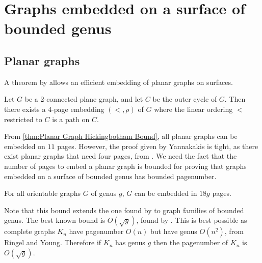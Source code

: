 
\section{Graphs embedded on a surface of bounded genus}\label{sec:pagenumber_bounded_genus}

\subsection{Planar graphs}\label{ssec:Planar_Graphs}
A theorem by \textcite{yannakakisEmbeddingPlanarGraphs1989} allows an efficient embedding of planar graphs on surfaces.
\begin{theorem}\label{thm:4Pages_Planar}
	Let $G$ be a 2-connected plane graph, and let $C$ be the outer cycle of $G$. Then there exists a $4$-page embedding $(<, \rho)$ of $G$ where the linear ordering $<$ restricted to $C$ is a path on $C$. 
\end{theorem}

From \cref{thm:Planar Graph Hickingbotham Bound}, all planar graphs can be embedded on $11$ pages. However, the proof given by Yannakakis is tight, as there exist planar graphs that need four pages, from \textcite{yannakakisPlanarGraphsThat2020, kaufmannFourPagesAre2020}. We need the fact that the number of pages to embed a planar graph is bounded for proving that graphs embedded on a surface of bounded genus has bounded pagenumber.

\begin{theorem}\label{thm:Genus_pagenumber_bound}
	For all orientable graphs \(G\) of genus $g$, $G$ can be embedded in $18g$ pages.
\end{theorem}
Note that this bound extends the one found by \textcite{yannakakisEmbeddingPlanarGraphs1989} to graph families of bounded genus.
The best known bound is \(O(\sqrt{g})\), found by \textcite{malitzGenusGraphsHave1994}. This is best possible as complete graphs $K_n$ have pagenumber $O(n)$ but have genus $O(n^2)$, from Ringel and Young\cite{ringelMapColorTheorem1974}. Therefore if $K_n$ has genus $g$ then the pagenumber of $K_n$ is $O(\sqrt{g})$.

